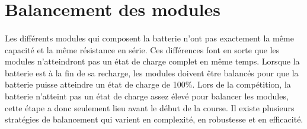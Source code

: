 
\section{Balancement des modules}
	\paragraph*{}
	Les différents modules qui composent la batterie n'ont pas exactement la même capacité et la même résistance en série. Ces différences font en sorte que les modules n'atteindront pas un état de charge complet en même temps. Lorsque la batterie est à la fin de sa recharge, les modules doivent être balancés pour que la batterie puisse atteindre un état de charge de 100\%. Lors de la compétition, la batterie n'atteint pas un état de charge assez élevé pour balancer les modules, cette étape a donc seulement lieu avant le début de la course. Il existe plusieurs stratégies de balancement qui varient en complexité, en robustesse et en efficacité.